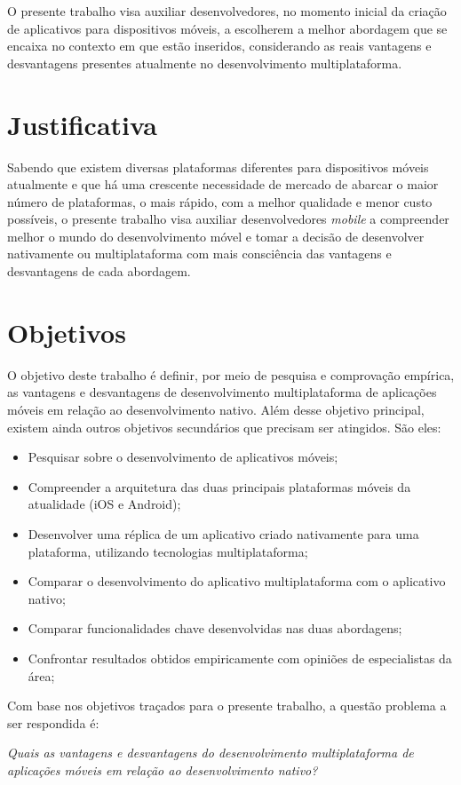 O presente trabalho visa auxiliar desenvolvedores, no momento inicial da criação de aplicativos 
para dispositivos móveis, a escolherem a melhor abordagem que se encaixa no contexto em que estão inseridos,
considerando as reais vantagens e desvantagens presentes atualmente no desenvolvimento multiplataforma.

\section{Justificativa}\label{sec:justificativa}

Sabendo que existem diversas plataformas diferentes para dispositivos móveis atualmente e que há uma crescente 
necessidade de mercado de abarcar o maior número de plataformas, o mais rápido, com a
melhor qualidade e menor custo possíveis, o presente trabalho visa auxiliar desenvolvedores \textit{mobile} 
a compreender melhor o mundo do desenvolvimento móvel e tomar a decisão de 
desenvolver nativamente ou multiplataforma com mais consciência das vantagens e desvantagens de cada abordagem.

\section{Objetivos} \label{sec:objetivos}

O objetivo deste trabalho é definir, por meio de pesquisa e comprovação empírica, as vantagens e desvantagens de desenvolvimento multiplataforma de aplicações móveis em relação ao desenvolvimento nativo. 
Além desse objetivo principal, existem ainda outros objetivos secundários que precisam ser atingidos. São eles: 
\begin{itemize}
    \item Pesquisar sobre o desenvolvimento de aplicativos móveis;
    \item Compreender a arquitetura das duas principais plataformas móveis da atualidade (iOS e Android);
    \item Desenvolver uma réplica de um aplicativo criado nativamente para uma plataforma, utilizando tecnologias multiplataforma;
    \item Comparar o desenvolvimento do aplicativo multiplataforma com o aplicativo nativo;
    \item Comparar funcionalidades chave desenvolvidas nas duas abordagens;
    \item Confrontar resultados obtidos empiricamente com opiniões de especialistas da área;
\end{itemize}
Com base nos objetivos traçados para o presente trabalho, a questão problema a ser respondida é:
\begin{center}
    \textit{Quais as vantagens e desvantagens do desenvolvimento multiplataforma de aplicações móveis em relação ao desenvolvimento nativo?}
\end{center}

